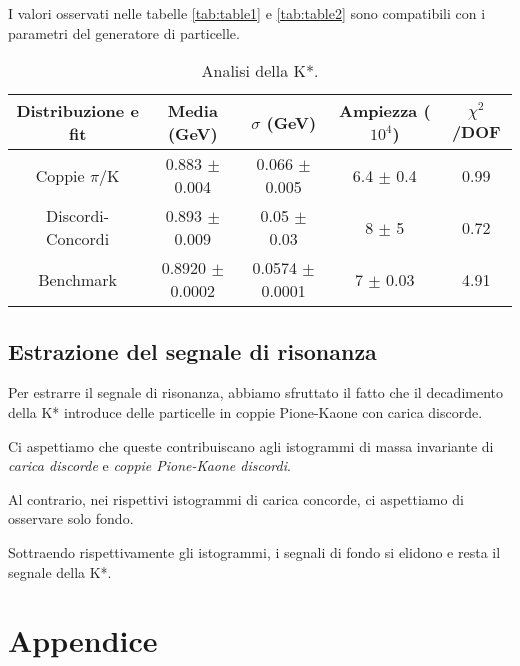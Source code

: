 \documentclass[12pt, a4paper]{article}
\begin{document}
I valori osservati nelle tabelle \ref{tab:table1} e \ref{tab:table2} sono compatibili con i parametri del generatore di particelle.

\begin{table}[H]
  \begin{center}
    \caption{Analisi della K*.}
    \label{tab:table3}
    \begin{tabular}{c|c|c|c|c} %
      \textbf{Distribuzione e fit} & 
      \textbf{Media (GeV)} & 
      \textbf{$\sigma$ (GeV)} & 
      \textbf{Ampiezza ($10^4$)} & 
      \textbf{$\chi^2$/DOF}\\
      
      \hline
      Coppie $\pi$/K  & 0.883 $\pm$ 0.004 &0.066 $\pm$ 0.005  & 6.4 $\pm$ 0.4 & 0.99\\
      Discordi-Concordi & 0.893 $\pm$ 0.009 & 0.05 $\pm$ 0.03 & 8 $\pm$ 5 & 0.72\\
      Benchmark & 0.8920 $\pm$ 0.0002 & 0.0574 $\pm$ 0.0001 & 7 $\pm$ 0.03  &  4.91\\
    \end{tabular}
  \end{center}
\end{table}

\subsection{Estrazione del segnale di risonanza}
Per estrarre il segnale di risonanza, abbiamo sfruttato il fatto che il decadimento della K* introduce delle particelle in coppie Pione-Kaone con carica discorde. 

Ci aspettiamo che queste contribuiscano agli istogrammi di massa invariante di \textit{carica discorde} e \textit{coppie Pione-Kaone discordi}.

Al contrario, nei rispettivi istogrammi di carica concorde, ci aspettiamo di osservare solo fondo.

Sottraendo rispettivamente gli istogrammi, i segnali di fondo si elidono e resta il segnale della K*.


\section{Appendice}
\end{document}
